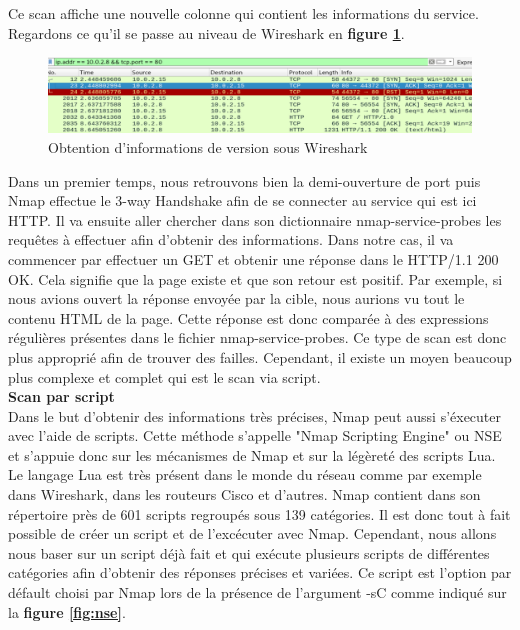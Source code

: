 \newpage
Ce scan affiche une nouvelle colonne qui contient les informations du service. Regardons ce qu'il se passe au niveau de Wireshark en \textbf{figure \ref{fig:svwire}}.

\begin{figure}[htp!]
  \centering
  \setlength\figureheight{7cm}
  \setlength\figurewidth{9cm}
  \includegraphics[width=1\textwidth]{oui/images/nmap/Wireversion.PNG}
  \caption{Obtention d'informations de version sous Wireshark}
  \label{fig:svwire}
\end{figure}

Dans un premier temps, nous retrouvons bien la demi-ouverture de port puis Nmap effectue le 3-way Handshake afin de se connecter au service qui est ici HTTP. Il va ensuite aller chercher dans son dictionnaire nmap-service-probes les requêtes à effectuer afin d'obtenir des informations. Dans notre cas, il va commencer par effectuer un GET et obtenir une réponse dans le HTTP/1.1 200 OK. Cela signifie que la page existe et que son retour est positif. Par exemple, si nous avions ouvert la réponse envoyée par la cible, nous aurions vu tout le contenu HTML de la page. Cette réponse est donc comparée à des expressions régulières présentes dans le fichier nmap-service-probes. Ce type de scan est donc plus approprié afin de trouver des failles. Cependant, il existe un moyen beaucoup plus complexe et complet qui est le scan via script.\\

\noindent \textbf{Scan par script}\\

Dans le but d'obtenir des informations très précises, Nmap peut aussi s'éxecuter avec l'aide de scripts. Cette méthode s'appelle "Nmap Scripting Engine" ou NSE et s'appuie donc sur les mécanismes de Nmap et sur la légèreté des scripts Lua. Le langage Lua est très présent dans le monde du réseau comme par exemple dans Wireshark, dans les routeurs Cisco et d'autres. Nmap contient dans son répertoire près de 601 scripts regroupés sous 139 catégories. Il est donc tout à fait possible de créer un script et de l'excécuter avec Nmap. Cependant, nous allons nous baser sur un script déjà fait et qui exécute plusieurs scripts de différentes catégories afin d'obtenir des réponses précises et variées. Ce script est l'option par défault choisi par Nmap lors de la présence de l'argument -sC comme indiqué sur la \textbf{figure \ref{fig:nse}}.\\

